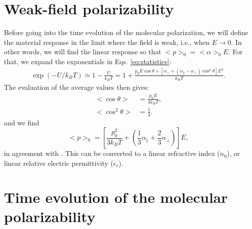 \documentclass[12pt,letterpaper]{article}
\begin{document}
\section{Weak-field polarizability}\label{weak_field}
Before going into the time evolution of the molecular polarization, we will define the material response in the limit where the field is weak, i.e., when $E\rightarrow 0$. In other words, we will find the linear response so that $<p>_0=<\alpha>_0 E$. For that, we expand the exponentials in Eqs. \eqref{eq:statistics}:
\begin{align}
  \exp(-U/k_BT)\simeq 1-\frac{U}{k_BT} = 1+\frac{p_0E\cos\theta+\left[\alpha_\bot + (\alpha_\parallel - \alpha_\bot)\cos^2\theta\right]E^2}{k_BT}.
\end{align}
The evaluation of the average values then gives:
\begin{subequations}\label{eq:statistics_weak_field}
 \begin{align}
  <\cos\theta>&=\frac{p_0 E}{3k_BT},\\
  <\cos^2\theta>&=\frac{1}{3}.
 \end{align}
\end{subequations}
and we find
\begin{equation}\label{eq:total_pol_weak_field}
 <p>_0=\left[\frac{p_0^2 }{3k_BT}+\left(\frac{1}{3}\alpha_\parallel + \frac{2}{3}\alpha_\bot\right)\right] E,
\end{equation}
in agreement with \cite{jackson1999,hook1991,boyd2008}. This can be converted to a linear refractive index ($n_0$), or linear relative electric permittivity ($\epsilon_r$).


\section{Time evolution of the molecular polarizability}\label{time}

 

\end{document}
